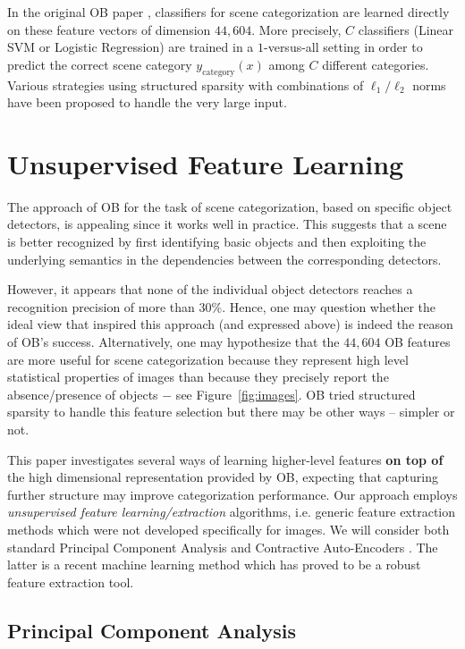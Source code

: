 \documentclass[runningheads,a4paper]{llncs}
\begin{document}
In the original OB paper \cite{LiJiaLi10}, classifiers for scene
categorization are learned directly on these feature vectors of
dimension $44,604$.
%
More precisely, $C$ classifiers (Linear SVM or
Logistic Regression) are trained in a $1$-versus-all setting in order to predict the
correct scene category $y_{\textrm{category}}(x)$ among $C$ different
categories.
%
Various strategies using structured sparsity with combinations
  of $\ell_1/\ell_2$ norms have been proposed to handle the
  very large input.

\section{Unsupervised Feature Learning}\label{sec:feat}

The approach of OB for the task of scene categorization,
based on specific object detectors, is appealing since it works well
in practice.
%
This suggests that a scene is better recognized by first identifying
basic objects and then exploiting the underlying semantics in the
dependencies between the corresponding detectors.
%

However, it appears that none of the individual object detectors
reaches a recognition precision of more than $30\%$. Hence, one may
question whether the ideal view that inspired this approach (and
expressed above) is indeed the reason of OB's success.
%
Alternatively, one may hypothesize that the $44,604$ OB features are
more useful for scene categorization because they represent high level
statistical properties of images than because they precisely report the 
absence/presence of objects $-$ see Figure~\ref{fig:images}.
%
OB tried structured sparsity to handle this feature selection but there may be
  other ways -- simpler or not.

This paper investigates several ways of learning higher-level features
{\bf on top of} the high dimensional representation provided by OB,
expecting that capturing further structure may improve categorization
performance. Our approach employs \textit{unsupervised feature
  learning/extraction} algorithms, i.e. generic feature extraction
methods which were not developed specifically for images. We will
consider both standard Principal Component Analysis and
Contractive Auto-Encoders
\cite{Rifai+al-2011}. The latter is a recent machine
learning method which has proved to be a robust feature extraction
tool.

\subsection{Principal Component Analysis}
\end{document}
